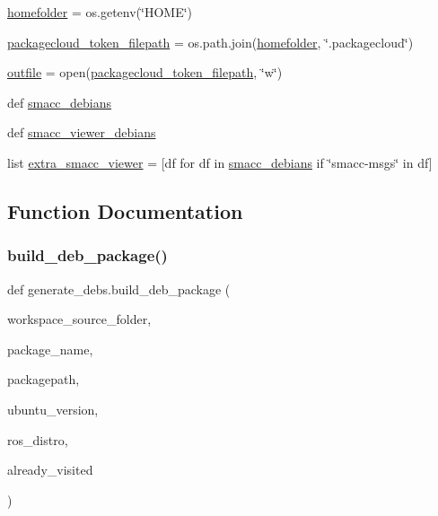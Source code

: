\begin{DoxyCompactItemize}
\item 
\hyperlink{namespacegenerate__debs_aeb83979be2939a8059435a906a91f682}{homefolder} = os.\+getenv(\char`\"{}H\+O\+ME\char`\"{})
\item 
\hyperlink{namespacegenerate__debs_a836a20b989c3c8e46255d91d10cb524f}{packagecloud\+\_\+token\+\_\+filepath} = os.\+path.\+join(\hyperlink{namespacegenerate__debs_aeb83979be2939a8059435a906a91f682}{homefolder}, \char`\"{}.packagecloud\char`\"{})
\item 
\hyperlink{namespacegenerate__debs_aa1faa039b35b72ee44dc6f106ad12911}{outfile} = open(\hyperlink{namespacegenerate__debs_a836a20b989c3c8e46255d91d10cb524f}{packagecloud\+\_\+token\+\_\+filepath}, \char`\"{}w\char`\"{})
\item 
def \hyperlink{namespacegenerate__debs_acca5eaf9f83b81a32c26c7a7c5f9bdd7}{smacc\+\_\+debians}
\item 
def \hyperlink{namespacegenerate__debs_a9ac114fabb6011d255a814a7919e64ae}{smacc\+\_\+viewer\+\_\+debians}
\item 
list \hyperlink{namespacegenerate__debs_aae153eaf5f6cddad5899c36fef7e1b10}{extra\+\_\+smacc\+\_\+viewer} = \mbox{[}df for df in \hyperlink{namespacegenerate__debs_acca5eaf9f83b81a32c26c7a7c5f9bdd7}{smacc\+\_\+debians} if \char`\"{}smacc-\/msgs\char`\"{} in df\mbox{]}
\end{DoxyCompactItemize}


\subsection{Function Documentation}
\mbox{\label{namespacegenerate__debs_aa70c3f4917ddc57b13eaed8501f571a8}} 
\subsubsection{\texorpdfstring{build\+\_\+deb\+\_\+package()}{build\_deb\_package()}}
{\footnotesize\ttfamily def generate\+\_\+debs.\+build\+\_\+deb\+\_\+package (\begin{DoxyParamCaption}\item[{}]{workspace\+\_\+source\+\_\+folder,  }\item[{}]{package\+\_\+name,  }\item[{}]{packagepath,  }\item[{}]{ubuntu\+\_\+version,  }\item[{}]{ros\+\_\+distro,  }\item[{}]{already\+\_\+visited }\end{DoxyParamCaption})}




